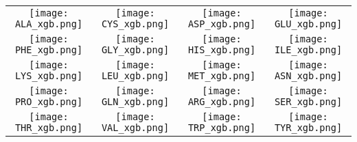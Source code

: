 \documentclass{standalone}
\begin{document}
\begin{tabular}{cccc}
\texttt{[image: ALA\_xgb.png]} & \texttt{[image: CYS\_xgb.png]} & \texttt{[image: ASP\_xgb.png]} & \texttt{[image: GLU\_xgb.png]} \\
\texttt{[image: PHE\_xgb.png]} & \texttt{[image: GLY\_xgb.png]} & \texttt{[image: HIS\_xgb.png]} & \texttt{[image: ILE\_xgb.png]} \\
\texttt{[image: LYS\_xgb.png]} & \texttt{[image: LEU\_xgb.png]} & \texttt{[image: MET\_xgb.png]} & \texttt{[image: ASN\_xgb.png]} \\
\texttt{[image: PRO\_xgb.png]} & \texttt{[image: GLN\_xgb.png]} & \texttt{[image: ARG\_xgb.png]} & \texttt{[image: SER\_xgb.png]} \\
\texttt{[image: THR\_xgb.png]} & \texttt{[image: VAL\_xgb.png]} & \texttt{[image: TRP\_xgb.png]} & \texttt{[image: TYR\_xgb.png]} 
\end{tabular}
\end{document}
